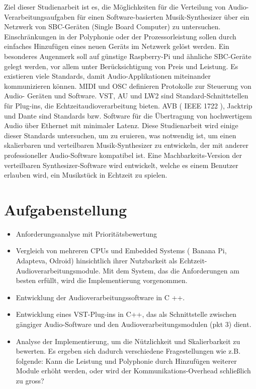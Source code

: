  Ziel dieser Studienarbeit ist es, die Möglichkeiten für die Verteilung von Audio- Verarbeitungsaufgaben für einen Software-basierten Musik-Synthesizer über ein Netzwerk von SBC-Geräten (Single Board Computer) zu untersuchen. Einschränkungen in der Polyphonie oder der Prozessorleistung sollen durch einfaches Hinzufügen eines neuen Geräts im Netzwerk gelöst werden. Ein besonderes Augenmerk soll auf günstige Raspberry-Pi und ähnliche SBC-Geräte gelegt werden, vor allem unter Berücksichtigung von Preis und Leistung. Es existieren viele Standards, damit Audio-Applikationen miteinander kommunizieren können. MIDI und OSC definieren Protokolle zur Steuerung von Audio- Geräten und Software. VST, AU und LW2 sind Standard-Schnittstellen für Plug-ins, die Echtzeitaudioverarbeitung bieten. AVB ( IEEE 1722 ), Jacktrip und Dante sind Standards bzw. Software für die Übertragung von hochwertigem Audio über Ethernet mit minimaler Latenz. Diese Studienarbeit wird einige dieser Standards untersuchen, um zu eruieren, was notwendig ist, um einen skalierbaren und verteilbaren Musik-Synthesizer zu entwickeln, der mit anderer professioneller Audio-Software kompatibel ist. Eine Machbarkeits-Version der verteilbaren Synthesizer-Software wird entwickelt, welche es einem Benutzer erlauben wird, ein Musikstück in Echtzeit zu spielen.

\section{Aufgabenstellung}

\begin{itemize}

\item Anforderungsanalyse mit Prioritätsbewertung

\item Vergleich von mehreren CPUs und Embedded Systems ( Banana Pi, Adapteva, Odroid) hinsichtlich ihrer Nutzbarkeit als Echtzeit- Audioverarbeitungsmodule. Mit dem System, das die Anforderungen am besten erfüllt, wird die Implementierung vorgenommen.

\item Entwicklung der Audioverarbeitungssoftware in C ++.

\item Entwicklung eines VST-Plug-ins in C++, das als Schnittstelle zwischen gängiger Audio-Software und den Audioverarbeitungsmodulen (pkt 3) dient.

\item Analyse der Implementierung, um die Nützlichkeit und Skalierbarkeit zu bewerten. Es ergeben sich dadurch verschiedene Fragestellungen wie z.B. folgende: Kann die Leistung und Polyphonie durch Hinzufügen weiterer Module erhöht werden, oder wird der Kommunikations-Overhead schließlich zu gross?

\end{itemize}


